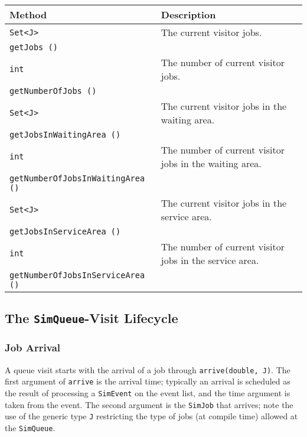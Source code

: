 \documentclass[12pt]{book}
\begin{document}
\begin{tabular}{|l|l|}
  \hline
  {\bf Method} & {\bf Description} \\
  \hline
  \lstinline[basicstyle=\footnotesize]!Set<J>!
    & The current visitor jobs.
    \\
  \lstinline[basicstyle=\footnotesize]!getJobs ()!
    &
    \\ \hline
  \lstinline[basicstyle=\footnotesize]!int!
    & The number of current visitor jobs.
    \\
  \lstinline[basicstyle=\footnotesize]!getNumberOfJobs ()!
    &
    \\ \hline
  \lstinline[basicstyle=\footnotesize]!Set<J>!
    & The current visitor jobs in the waiting area.
    \\
  \lstinline[basicstyle=\footnotesize]!getJobsInWaitingArea ()!
    &
    \\ \hline
  \lstinline[basicstyle=\footnotesize]!int!
    & The number of current visitor jobs in the waiting area.
    \\
  \lstinline[basicstyle=\footnotesize]!getNumberOfJobsInWaitingArea ()!
    &
    \\ \hline
  \lstinline[basicstyle=\footnotesize]!Set<J>!
    & The current visitor jobs in the service area.
    \\
  \lstinline[basicstyle=\footnotesize]!getJobsInServiceArea ()!
    &
    \\ \hline
  \lstinline[basicstyle=\footnotesize]!int!
    & The number of current visitor jobs in the service area.
    \\
  \lstinline[basicstyle=\footnotesize]!getNumberOfJobsInServiceArea ()!
    &
    \\ \hline
\end{tabular}

\subsection{The \lstinline|SimQueue|-Visit Lifecycle}

\subsubsection{Job Arrival}

A queue visit starts with the arrival of a job
  through \lstinline|arrive(double, J)|.
The first argument of \lstinline|arrive| is the arrival time;
  typically an arrival is scheduled as the result of
  processing a \lstinline|SimEvent| on the event list,
  and the time argument is taken from the event.
The second argument is the \lstinline|SimJob| that arrives;
  note the use of the generic type \lstinline|J|
  restricting the type of jobs (at compile time)
  allowed at the \lstinline|SimQueue|.
\end{document}
